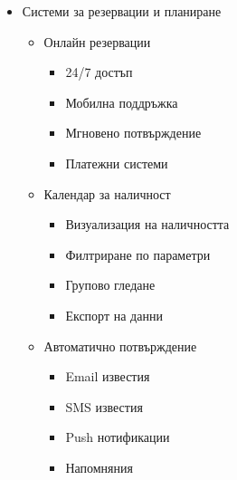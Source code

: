\documentclass[12pt,a4paper]{article}
\begin{document}
\begin{itemize}
    \item Системи за резервации и планиране
    \begin{itemize}
        \item Онлайн резервации
        \begin{itemize}
            \item 24/7 достъп
            \item Мобилна поддръжка
            \item Мгновено потвърждение
            \item Платежни системи
        \end{itemize}
        \item Календар за наличност
        \begin{itemize}
            \item Визуализация на наличността
            \item Филтриране по параметри
            \item Групово гледане
            \item Експорт на данни
        \end{itemize}
        \item Автоматично потвърждение
        \begin{itemize}
            \item Email известия
            \item SMS известия
            \item Push нотификации
            \item Напомняния
        \end{itemize}
    \end{itemize}
    

\end{itemize}
\end{document}
